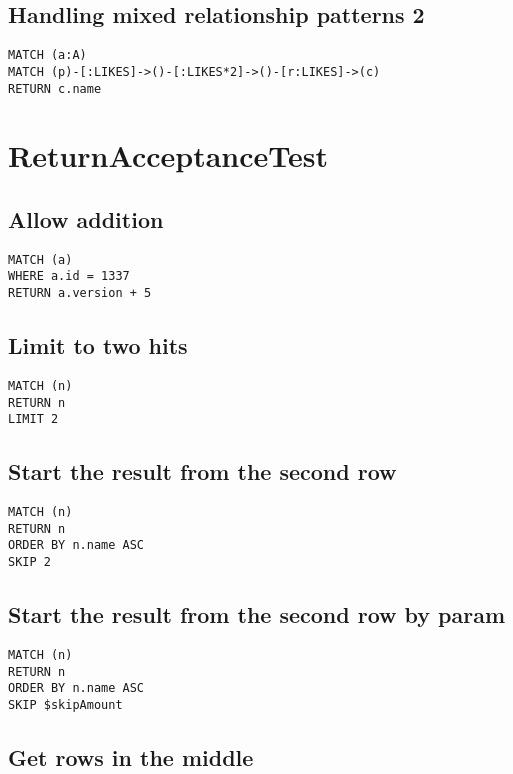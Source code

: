 \subsection{Handling mixed relationship patterns 2}

\begin{lstlisting}
MATCH (a:A)
MATCH (p)-[:LIKES]->()-[:LIKES*2]->()-[r:LIKES]->(c)
RETURN c.name
\end{lstlisting}
\section{ReturnAcceptanceTest}


\subsection{Allow addition}

\begin{lstlisting}
MATCH (a)
WHERE a.id = 1337
RETURN a.version + 5
\end{lstlisting}

\subsection{Limit to two hits}

\begin{lstlisting}
MATCH (n)
RETURN n
LIMIT 2
\end{lstlisting}

\subsection{Start the result from the second row}

\begin{lstlisting}
MATCH (n)
RETURN n
ORDER BY n.name ASC
SKIP 2
\end{lstlisting}

\subsection{Start the result from the second row by param}

\begin{lstlisting}
MATCH (n)
RETURN n
ORDER BY n.name ASC
SKIP $skipAmount
\end{lstlisting}

\subsection{Get rows in the middle}

